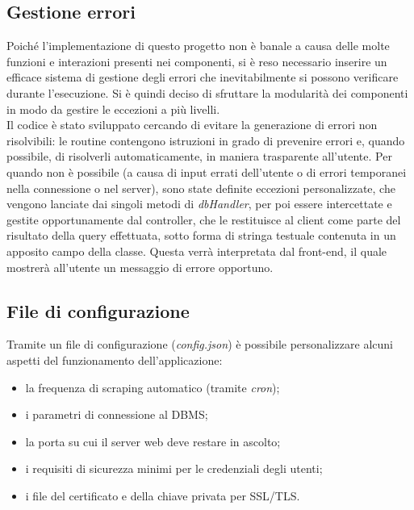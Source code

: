 \documentclass[11pt]{report}
\begin{document}
\subsection{Gestione errori}
Poiché l'implementazione di questo progetto non è banale a causa delle molte funzioni e interazioni presenti nei componenti, si è reso necessario inserire un efficace sistema di gestione degli errori che inevitabilmente si possono verificare durante l'esecuzione.
Si è quindi deciso di sfruttare la modularità dei componenti in modo da gestire le eccezioni a più livelli.
\\Il codice è stato sviluppato cercando di evitare la generazione di errori non risolvibili: le routine contengono istruzioni in grado di prevenire errori e, quando possibile, di risolverli automaticamente, in maniera trasparente all'utente.
Per quando non è possibile (a causa di input errati dell'utente o di errori temporanei nella connessione o nel server), sono state definite eccezioni personalizzate, che vengono lanciate dai singoli metodi di \textit{dbHandler}, per poi essere intercettate e gestite opportunamente dal controller, che le restituisce al client come parte del risultato della query effettuata, sotto forma di stringa testuale contenuta in un apposito campo della classe.
Questa verrà interpretata dal front-end, il quale mostrerà all'utente un messaggio di errore opportuno.
\subsection{File di configurazione}
Tramite un file di configurazione (\textit{config.json}) è possibile personalizzare alcuni aspetti del funzionamento dell'applicazione:
\begin{itemize}
	\item la frequenza di scraping automatico (tramite \textit{cron});
	\item i parametri di connessione al DBMS;
	\item la porta su cui il server web deve restare in ascolto;
	\item i requisiti di sicurezza minimi per le credenziali degli utenti;
	\item i file del certificato e della chiave privata per SSL/TLS.
\end{itemize}
\pagebreak
\end{document}
